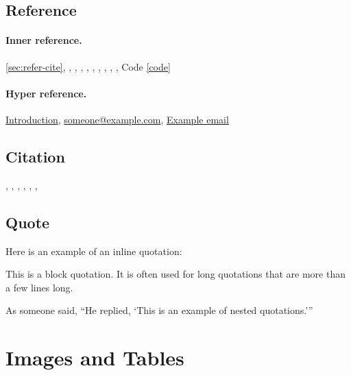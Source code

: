 \documentclass{article}
\begin{document}
\subsection{Reference}
\paragraph{Inner reference.}
\cref{sec:refer-cite}, , , , , , , , , , Code \ref{code}

\paragraph{Hyper reference.}
\hyperref[sec:refer-cite]{Introduction},
\href{mailto:someone@example.com}{someone@example.com},
\href{https://www.example.com}{Example email}

\subsection{Citation}
\cite{VaswaniSPUJGKP17},
\citep{VaswaniSPUJGKP17},
\citet{VaswaniSPUJGKP17},
\citealt{VaswaniSPUJGKP17}, \citealp{VaswaniSPUJGKP17},
\citealt*{VaswaniSPUJGKP17},
\citeauthor{VaswaniSPUJGKP17}


\subsection{Quote}
Here is an example of an inline quotation: 

\begin{displayquote}
This is a block quotation. It is often used for long quotations that are more than a few lines long.
\end{displayquote}

As someone said, \enquote{He replied, \enquote{This is an example of nested quotations.}}









\clearpage
\section{Images and Tables}
\end{document}
